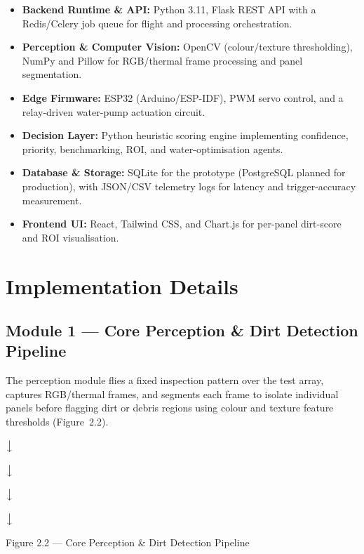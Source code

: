 \documentclass[12pt]{report}
\newcommand{\flowarrow}{\par\centering$\big\downarrow$\par}
\begin{document}
\begin{itemize}[leftmargin=*]
    \item \textbf{Backend Runtime \& API:} Python 3.11, Flask REST API with a Redis/Celery job queue for flight and processing orchestration.
    \item \textbf{Perception \& Computer Vision:} OpenCV (colour/texture thresholding), NumPy and Pillow for RGB/thermal frame processing and panel segmentation.
    \item \textbf{Edge Firmware:} ESP32 (Arduino/ESP-IDF), PWM servo control, and a relay-driven water-pump actuation circuit.
    \item \textbf{Decision Layer:} Python heuristic scoring engine implementing confidence, priority, benchmarking, ROI, and water-optimisation agents.
    \item \textbf{Database \& Storage:} SQLite for the prototype (PostgreSQL planned for production), with JSON/CSV telemetry logs for latency and trigger-accuracy measurement.
    \item \textbf{Frontend UI:} React, Tailwind CSS, and Chart.js for per-panel dirt-score and ROI visualisation.
\end{itemize}

\section{Implementation Details}

\subsection{Module 1 --- Core Perception \& Dirt Detection Pipeline}

The perception module flies a fixed inspection pattern over the test array, captures RGB/thermal frames, and segments each frame to isolate individual panels before flagging dirt or debris regions using colour and texture feature thresholds (Figure~2.2).

\begin{center}
\begin{minipage}{0.7\linewidth}
\centering
{}
\flowarrow
{}
\flowarrow
{}
\flowarrow
{}
\flowarrow
{}
\end{minipage}
\end{center}
\begin{center}
\small Figure 2.2 --- Core Perception \& Dirt Detection Pipeline
\end{center}
\end{document}
